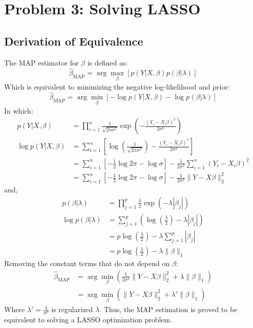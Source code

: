 \documentclass[11pt, a4paper, oneside]{memoir}
\begin{document}
\chapter{Problem 3: Solving LASSO}
\section{Derivation of Equivalence}
The MAP estimator for $\beta$ is defined as:
\[ \hat{\beta}_{\text{MAP}}  = \arg \max_{\beta} \left[ p(Y | X, \beta) p(\beta | \lambda) \right] \]
Which is equivalent to minimizing the negative log-likelihood and prior:
\[ \hat{\beta}_{\text{MAP}} = \arg \min_{\beta} \left[ -\log p(Y | X, \beta) - \log p(\beta | \lambda) \right] \]
In which:
\begin{align*}
    p(Y | X, \beta)      & = \prod_{i=1}^{n} \frac{1}{\sqrt{2\pi\sigma^2}} \exp \left( -\frac{(Y_i - X_i\beta)^2}{2\sigma^2} \right)                  \\
    \log p(Y | X, \beta) & = \sum_{i=1}^{n} \left[ \log \left( \frac{1}{\sqrt{2\pi\sigma^2}} \right) - \frac{(Y_i - X_i\beta)^2}{2\sigma^2} \right]   \\
                         & = \sum_{i=1}^{n} \left[ -\frac{1}{2}\log{2\pi} -\log\sigma \right] - \frac{1}{2\sigma^2} \sum_{i=1}^{n} (Y_i - X_i\beta)^2 \\
                         & = \sum_{i=1}^{n} \left[ -\frac{1}{2}\log{2\pi} -\log\sigma \right] - \frac{1}{2\sigma^2} \|Y - X\beta\|_2^2
\end{align*}
and,
\begin{align*}
    p(\beta | \lambda)      & = \prod_{j=1}^{p} \frac{\lambda}{2} \exp (-\lambda |\beta_j|)                             \\
    \log p(\beta | \lambda) & = \sum_{j=1}^{p} \left( \log \left( \frac{\lambda}{2} \right) - \lambda |\beta_j| \right) \\
                            & = p \log \left( \frac{\lambda}{2} \right) - \lambda \sum_{j=1}^{p} |\beta_j|              \\
                            & = p \log \left( \frac{\lambda}{2} \right) - \lambda \|\beta\|_1
\end{align*}
Removing the constant terms that do not depend on $\beta$:
\begin{align*}
    \hat{\beta}_{\text{MAP}} & = \arg \min_{\beta} \left( \frac{1}{2\sigma^2} \|Y - X\beta\|_2^2 + \lambda \|\beta\|_1 \right) \\
                             & = \arg \min_{\beta} \left( \|Y - X\beta\|_2^2 + \lambda' \|\beta\|_1 \right)
\end{align*}
Where $\lambda' = \frac{\lambda}{\sigma^2}$ is regularized $\lambda$. Thus, the MAP estimation is proved to be equivalent to solving a LASSO optimization problem.
\end{document}
